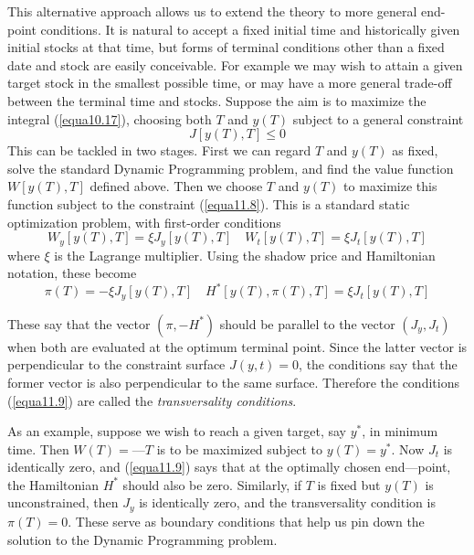 This alternative approach allows us to extend the theory to more general end-point conditions. It is natural to accept a fixed initial time and historically given initial stocks at that time, but forms of terminal conditions other than a fixed date and stock are easily conceivable. For example we may wish to attain a given target stock in the smallest possible time, or may have a more general trade-off between the terminal time and stocks. Suppose the aim is to maximize the integral (\ref{equa10.17}), choosing both $T$ and $y(T)$ subject to a general constraint
\begin{equation} \label{equa11.8}
J[y(T), T] \leq 0
\end{equation}
This can be tackled in two stages. First we can regard $T$ and $y(T)$ as fixed, solve the standard Dynamic Programming problem, and find the value function $W[y(T), T]$ defined above. Then we choose $T$ and $y(T)$ to maximize this function subject to the constraint (\ref{equa11.8}). This is a standard static optimization problem, with first-order conditions
\begin{equation*}
 W_y[y(T), T] = \xi J_y[y(T),T]  \quad  W_t[y(T),T] = \xi J_t[y(T),T]
\end{equation*}
where $\xi$ is the Lagrange multiplier. Using the shadow price and Hamiltonian notation, these become
\begin{equation} \label{equa11.9}
 \pi(T) = - \xi J_y[y(T), T]   \quad   H^*[y(T), \pi(T), T] = \xi J_t[y(T), T]
\end{equation}

These say that the vector $(\pi, -H^*)$ should be parallel to the vector $(J_y, J_t)$ when both are evaluated at the optimum terminal point. Since the latter vector is perpendicular to the constraint surface $J(y,t)=0$, the conditions say that the former vector is also perpendicular to the same surface. Therefore the conditions (\ref{equa11.9}) are called the \textit{transversality conditions}.

As an example, suppose we wish to reach a given target, say $y^*$, in minimum time. Then $W(T) = —T$ is to be maximized subject to $y(T) = y^*$. Now $J_t$ is identically zero, and (\ref{equa11.9}) says that at the optimally chosen end—point, the Hamiltonian $H^*$ should also be zero. Similarly, if $T$ is fixed but $y(T)$ is unconstrained, then $J_y$ is identically zero, and the transversality condition is $\pi(T) = 0$. These serve as boundary conditions that help us pin down the solution to the Dynamic Programming problem.

